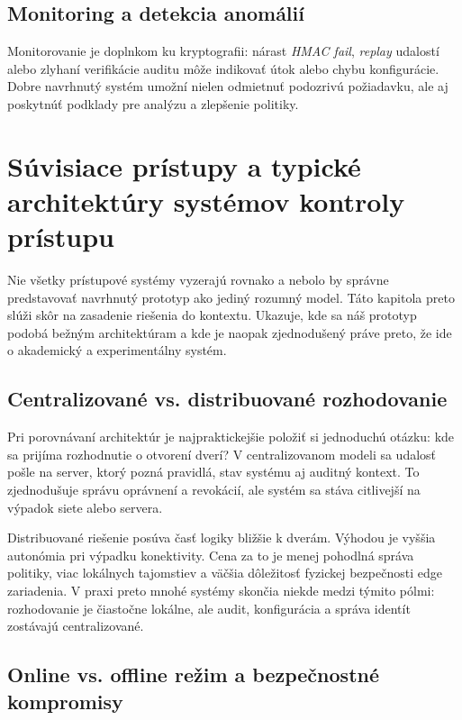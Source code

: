 \documentclass[journal,a4paper,onecolumn]{IEEEtran}
\begin{document}
\subsection{Monitoring a detekcia anomálií}

Monitorovanie je doplnkom ku kryptografii: nárast \emph{HMAC fail}, \emph{replay} udalostí alebo zlyhaní verifikácie auditu môže indikovať útok alebo chybu konfigurácie. Dobre navrhnutý systém umožní nielen odmietnuť podozrivú požiadavku, ale aj poskytnúť podklady pre analýzu a zlepšenie politiky.


\section{Súvisiace prístupy a typické architektúry systémov kontroly prístupu}

Nie všetky prístupové systémy vyzerajú rovnako a nebolo by správne predstavovať navrhnutý prototyp ako jediný rozumný model. Táto kapitola preto slúži skôr na zasadenie riešenia do kontextu. Ukazuje, kde sa náš prototyp podobá bežným architektúram a kde je naopak zjednodušený práve preto, že ide o akademický a experimentálny systém.

\subsection{Centralizované vs. distribuované rozhodovanie}

Pri porovnávaní architektúr je najpraktickejšie položiť si jednoduchú otázku: kde sa prijíma rozhodnutie o otvorení dverí? V centralizovanom modeli sa udalosť pošle na server, ktorý pozná pravidlá, stav systému aj auditný kontext. To zjednodušuje správu oprávnení a revokácií, ale systém sa stáva citlivejší na výpadok siete alebo servera.

Distribuované riešenie posúva časť logiky bližšie k dverám. Výhodou je vyššia autonómia pri výpadku konektivity. Cena za to je menej pohodlná správa politiky, viac lokálnych tajomstiev a väčšia dôležitosť fyzickej bezpečnosti edge zariadenia. V praxi preto mnohé systémy skončia niekde medzi týmito pólmi: rozhodovanie je čiastočne lokálne, ale audit, konfigurácia a správa identít zostávajú centralizované.

\subsection{Online vs. offline režim a bezpečnostné kompromisy}
\end{document}
